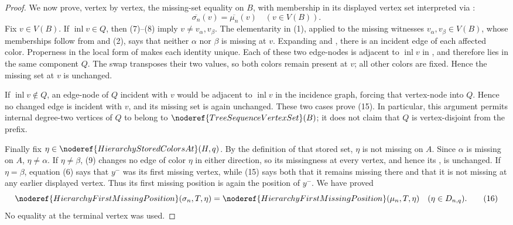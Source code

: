 \begin{proof}
We now prove, vertex by vertex, the missing-set equality on \(B\), with
membership in its displayed vertex set interpreted via
:
\[
 \overline{\sigma_n}(v)=\overline{\mu_n}(v)
                         \quad(v\in V(B)).                    \tag{15}
\]
Fix \(v\in V(B)\).  If \(\operatorname{inl}v\in Q\), then (7)--(8)
imply \(v\ne v_\alpha,v_\beta\).  The elementarity in (1), applied to
the missing witnesses \(v_\alpha,v_\beta\in V(B)\), whose memberships
follow from  and (2), says that neither
\(\alpha\) nor \(\beta\) is missing at \(v\).  Expanding
 and , there is an incident
edge of each affected color.  Properness in the local form of
 makes each identity unique.  Each of these
two edge-nodes is adjacent to \(\operatorname{inl}v\) in
, and therefore lies in the same component
\(Q\).  The swap transposes their two values, so both colors remain present
at \(v\); all other colors are fixed.  Hence the missing set at \(v\) is
unchanged.

If \(\operatorname{inl}v\notin Q\), an edge-node of \(Q\) incident with
\(v\) would be adjacent to \(\operatorname{inl}v\) in the incidence graph,
forcing that vertex-node into \(Q\).  Hence no changed edge is incident
with \(v\), and its missing set is again unchanged.  These two cases prove
(15).  In particular, this argument permits internal degree-two vertices
of \(Q\) to belong to \(\noderef{TreeSequenceVertexSet}(B)\); it does not
claim that \(Q\) is vertex-disjoint from the prefix.

Finally fix
\(\eta\in\noderef{HierarchyStoredColorsAt}(H,q)\).  By the definition of
that stored set, \(\eta\) is not missing on \(A\).  Since \(\alpha\) is
missing on \(A\), \(\eta\ne\alpha\).  If \(\eta\ne\beta\), (9) changes
no edge of color \(\eta\) in either direction, so its missingness at every
vertex, and hence its
, is unchanged.  If
\(\eta=\beta\), equation (6) says that \(y^-\) was its first missing
vertex, while (15) says both that it remains missing there and that it is
not missing at any earlier displayed vertex.  Thus its first missing
position is again the position of \(y^-\).  We have proved
\[
 \noderef{HierarchyFirstMissingPosition}(\sigma_n,T,\eta)
 =\noderef{HierarchyFirstMissingPosition}(\mu_n,T,\eta)
 \quad(\eta\in D_{n,q}).                                      \tag{16}
\]
No equality at the terminal vertex was used.


\end{proof}
